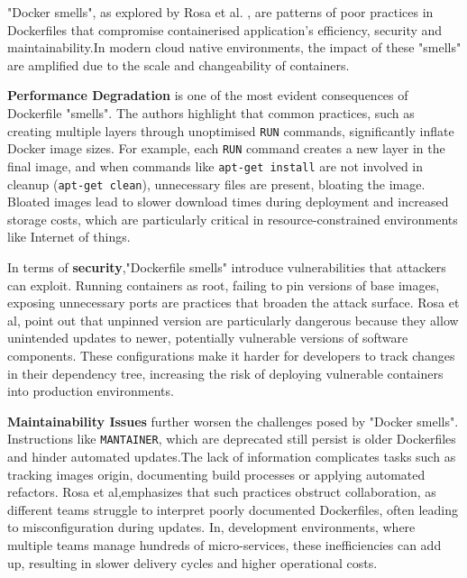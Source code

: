 "Docker smells", as explored by Rosa et al. \cite{DockerArtifacts}, are patterns of poor practices in Dockerfiles that compromise containerised application's efficiency, security and maintainability.In modern cloud native environments, the impact of these "smells" are amplified due to the scale and changeability of containers. 

\textbf{Performance Degradation} is one of the most evident consequences of Dockerfile "smells". The authors highlight that common practices, such as creating multiple layers through unoptimised \verb|RUN| commands, significantly inflate Docker image sizes. For example, each \verb|RUN| command creates a new layer in the final image, and when commands like \verb|apt-get install| are not involved in cleanup (\verb|apt-get clean|), unnecessary files are present, bloating the image. Bloated images lead to slower download times during deployment and increased storage costs, which are particularly critical in resource-constrained environments like Internet of things. \cite{securityDocker}

In terms of \textbf{security},"Dockerfile smells" introduce vulnerabilities that attackers can exploit. Running containers as root, failing to pin versions of base images, exposing unnecessary ports are practices that broaden the attack surface. Rosa et al, point out that unpinned version are particularly dangerous because they allow unintended updates to newer, potentially vulnerable versions of software components. These configurations make it harder for developers to track changes in their dependency tree, increasing the risk of deploying vulnerable containers into production environments.\cite{DockerArtifacts}

\textbf{Maintainability Issues} further worsen the challenges posed by "Docker smells". Instructions like \verb|MANTAINER|, which are deprecated still persist is older Dockerfiles and hinder automated updates.The lack of information complicates tasks such as tracking images origin, documenting build processes or applying automated refactors. Rosa et al,emphasizes that such practices obstruct collaboration, as different teams struggle to interpret poorly documented Dockerfiles, often leading to misconfiguration during updates.
In, development environments, where multiple teams manage hundreds of micro-services, these inefficiencies can add up, resulting in slower delivery cycles and higher operational costs.\cite{DockerArtifacts}

